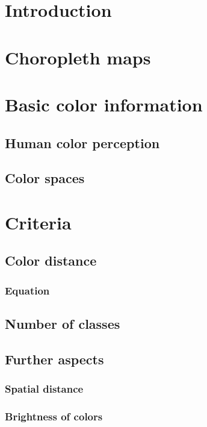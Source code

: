 \section{Introduction}


\section{Choropleth maps}

\section{Basic color information}

\subsection{Human color perception}

\subsection{Color spaces}

\section{Criteria}

\subsection{Color distance}

\subsubsection{Equation}

\subsection{Number of classes}

\subsection{Further aspects}

\subsubsection{Spatial distance}

\subsubsection{Brightness of colors}

